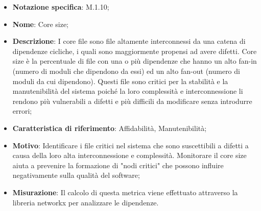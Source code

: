 \begin{itemize}
    \item \textbf{Notazione specifica}: M.1.10;
    \item \textbf{Nome}: Core size;
    \item \textbf{Descrizione}: I core file sono file altamente interconnessi da una catena di dipendenze cicliche, i quali sono maggiormente propensi ad avere difetti. Core size è la percentuale di file con una o più dipendenze che hanno un alto fan-in (numero di moduli che dipendono da essi) ed un alto fan-out (numero di moduli da cui dipendono). Questi file sono critici per la stabilità e la manutenibilità del sistema poiché la loro complessità e interconnessione li rendono più vulnerabili a difetti e più difficili da modificare senza introdurre errori;
    \item \textbf{Caratteristica di riferimento}: Affidabilità, Manutenibilità;
    \item \textbf{Motivo}: Identificare i file critici nel sistema che sono suscettibili a difetti a causa della loro alta interconnessione e complessità. Monitorare il core size aiuta a prevenire la formazione di "nodi critici" che possono influire negativamente sulla qualità del software;
    \item \textbf{Misurazione}: Il calcolo di questa metrica viene effettuato attraverso la libreria networkx per analizzare le dipendenze.
    
\end{itemize}
